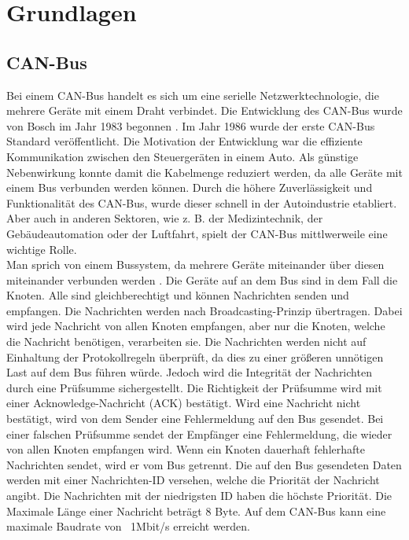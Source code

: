 \chapter{Grundlagen}


\section{CAN-Bus}
Bei einem CAN-Bus handelt es sich um eine serielle Netzwerktechnologie, 
die mehrere Geräte mit einem Draht verbindet.
Die Entwicklung des CAN-Bus wurde von Bosch im Jahr 1983 begonnen \cite[Seiten 2--10]{Voss2008}. 
Im Jahr 1986 wurde der erste CAN-Bus Standard 
veröffentlicht.
Die Motivation der Entwicklung war die effiziente Kommunikation zwischen den Steuergeräten in einem Auto. 
Als günstige
Nebenwirkung konnte damit die Kabelmenge reduziert werden, da alle Geräte mit einem Bus verbunden werden können.
Durch die höhere Zuverlässigkeit und Funktionalität des CAN-Bus, wurde dieser schnell in der Autoindustrie etabliert.
Aber auch in anderen Sektoren, wie z. B. der Medizintechnik, der Gebäudeautomation oder der Luftfahrt, spielt der
CAN-Bus mittlwerweile eine wichtige Rolle.
\\
Man sprich von einem Bussystem, da mehrere Geräte miteinander über diesen miteinander verbunden werden \cite[Seiten 13--19]{Voss2008}. 
Die Geräte auf an dem Bus sind in dem Fall die Knoten. Alle sind gleichberechtigt und können Nachrichten senden und empfangen.
Die Nachrichten werden nach Broadcasting-Prinzip übertragen. Dabei wird jede Nachricht von allen Knoten empfangen, 
aber nur die Knoten, welche die Nachricht benötigen, verarbeiten sie. 
Die Nachrichten werden nicht auf Einhaltung der Protokollregeln 
überprüft, da dies zu einer größeren unnötigen Last auf dem Bus führen würde. 
Jedoch wird die Integrität der Nachrichten durch eine Prüfsumme sichergestellt. Die Richtigkeit der Prüfsumme wird mit 
einer Acknowledge-Nachricht (ACK) bestätigt. Wird eine Nachricht nicht bestätigt, wird von dem Sender eine Fehlermeldung
auf den Bus gesendet.
Bei einer falschen Prüfsumme sendet der Empfänger eine Fehlermeldung, die wieder von allen Knoten empfangen wird.
Wenn ein Knoten dauerhaft fehlerhafte
Nachrichten sendet, wird er vom Bus getrennt. Die auf den Bus gesendeten Daten werden mit einer Nachrichten-ID
versehen, welche die Priorität der Nachricht angibt. Die Nachrichten mit der niedrigsten ID haben die höchste Priorität.
Die Maximale Länge einer Nachricht beträgt 8 Byte. 
Auf dem CAN-Bus kann eine maximale Baudrate von \ 1Mbit/s erreicht werden.
